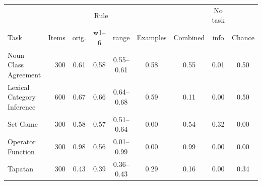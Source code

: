 \begin{tabular}{@{}lrccccccc@{}}
\toprule
 & & \multicolumn{3}{c}{Rule} & & & No task & \\
\cmidrule(lr){3-5}
Task & Items & orig. & w1--6 & range & Examples & Combined & info & Chance \\
\midrule
Noun Class Agreement & 300 & 0.61 & 0.58 & 0.55--0.61 & 0.58 & 0.55 & 0.01 & 0.50 \\
Lexical Category Inference & 600 & 0.67 & 0.66 & 0.64--0.68 & 0.59 & 0.11 & 0.00 & 0.50 \\
Set Game & 300 & 0.58 & 0.57 & 0.51--0.64 & 0.00 & 0.54 & 0.32 & 0.00 \\
Operator Function & 300 & 0.98 & 0.56 & 0.01--0.99 & 0.00 & 0.99 & 0.00 & 0.00 \\
Tapatan & 300 & 0.43 & 0.39 & 0.36--0.43 & 0.29 & 0.16 & 0.00 & 0.34 \\
\bottomrule
\end{tabular}
